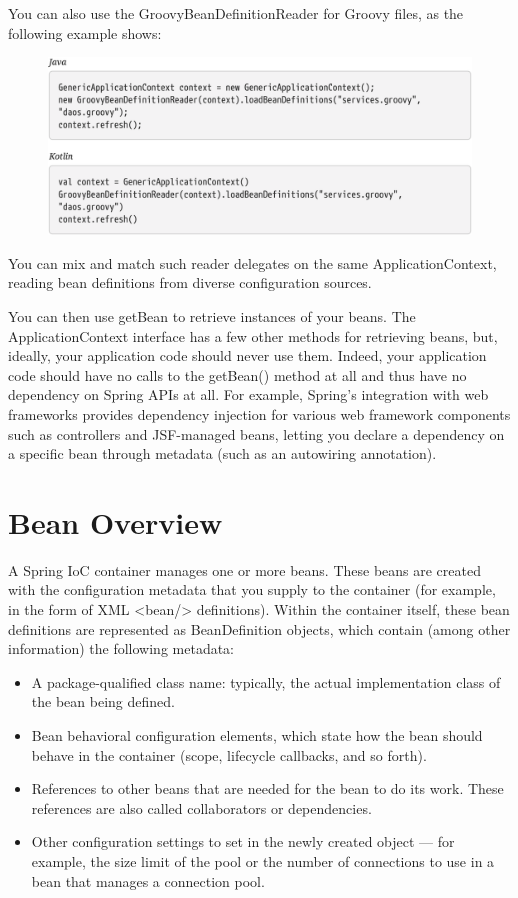 \newpage
You can also use the GroovyBeanDefinitionReader for Groovy files, as the following example shows:

\begin{figure}[ht]
    \centering
    \includegraphics[width=1\linewidth]{./Figure/IMG_code_11.png}
\end{figure}

You can mix and match such reader delegates on the same ApplicationContext, reading bean
definitions from diverse configuration sources.

You can then use getBean to retrieve instances of your beans. The ApplicationContext interface has a
few other methods for retrieving beans, but, ideally, your application code should never use them.
Indeed, your application code should have no calls to the getBean() method at all and thus have no
dependency on Spring APIs at all. For example, Spring’s integration with web frameworks provides
dependency injection for various web framework components such as controllers and JSF-managed
beans, letting you declare a dependency on a specific bean through metadata (such as an
autowiring annotation).

\section{Bean Overview}
A Spring IoC container manages one or more beans. These beans are created with the configuration
metadata that you supply to the container (for example, in the form of XML <bean/> definitions).
Within the container itself, these bean definitions are represented as BeanDefinition objects, which
contain (among other information) the following metadata:

\begin{itemize}
    \item A package-qualified class name: typically, the actual implementation class of the bean being
    defined.
    \item Bean behavioral configuration elements, which state how the bean should behave in the
    container (scope, lifecycle callbacks, and so forth).
    \item References to other beans that are needed for the bean to do its work. These references are also
    called collaborators or dependencies.
    \item Other configuration settings to set in the newly created object — for example, the size limit of
    the pool or the number of connections to use in a bean that manages a connection pool.
\end{itemize}

